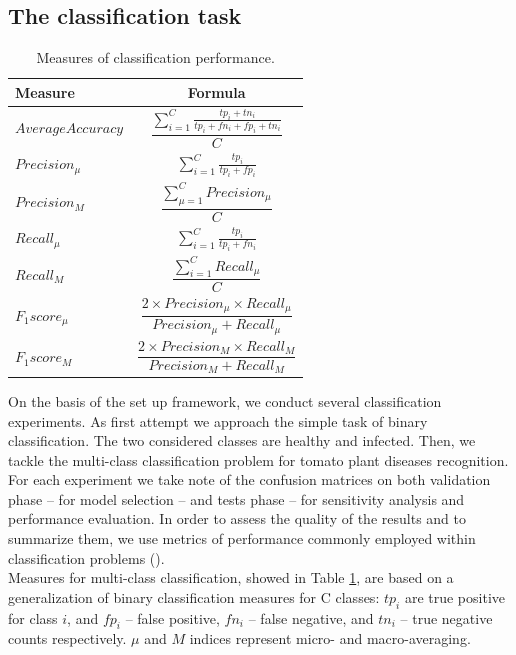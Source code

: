 \subsection{The classification task}
\begin{table}[H]
	\begin{center}
		\begin{tabular}{|l|c|}
			\hline
			\textbf{Measure} & \textbf{Formula} \\ 
			\hline
			$Average Accuracy$ & $\dfrac{\sum_{i=1}^{C} \frac{tp_i+tn_i}{tp_i+fn_i+fp_i+tn_i}}{C}$ \\
			$Precision_\mu$ & $\sum_{i=1}^{C} \frac{tp_i}{tp_i+fp_i}$ \\
			$Precision_M$ & $\dfrac{\sum_{\mu=1}^{C} Precision_\mu}{C}$ \\
			$Recall_\mu$ & $\sum_{i=1}^{C} \frac{tp_i}{tp_i+fn_i}$ \\
			$Recall_M$ & $\dfrac{\sum_{i=1}^{C} Recall_\mu}{C}$ \\
			$F_1 score_\mu$ & $\dfrac{2\times Precision_\mu \times Recall_\mu}{Precision_\mu+Recall_\mu}$ \\
			$F_1 score_M$ & $\dfrac{2\times Precision_M \times Recall_M}{Precision_M+Recall_M}$ \\
			\hline
		\end{tabular}
	\end{center}
	\caption{Measures of classification performance.}
	\label{table:1}
\end{table}
On the basis of the set up framework, we conduct several classification experiments. As first attempt we approach the simple task of binary classification. The two considered classes are healthy and infected. Then, we tackle the multi-class classification problem for tomato plant diseases recognition. For each experiment we take note of the confusion matrices on both validation phase -- for model selection -- and tests phase -- for sensitivity analysis and performance evaluation. In order to assess the quality of the results and to summarize them, we use metrics of performance commonly employed within classification problems (\cite{ref}).
\\\indent
Measures for multi-class classification, showed in Table \ref{table:1}, are based on a generalization of binary classification measures for C classes: $tp_i$ are true positive for class $i$, and $fp_i$ – false positive, $fn_i$ – false negative, and $tn_i$ – true negative counts respectively. $\mu$ and $M$ indices represent micro- and macro-averaging.
